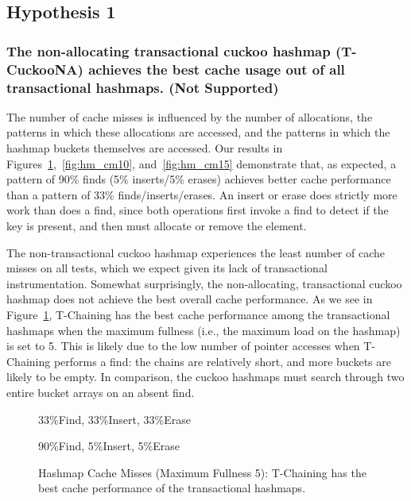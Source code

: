 \subsection{Hypothesis 1}
\subsubsection{The non-allocating transactional cuckoo hashmap (T-CuckooNA) achieves the best cache usage out of all transactional hashmaps. (Not Supported)}
\label{section:hmcm}

The number of cache misses is influenced by the number of allocations, the patterns in which these allocations are accessed, and the patterns in which the hashmap buckets themselves are accessed. Our results in Figures~\ref{fig:hm_cm5},~\ref{fig:hm_cm10}, and~\ref{fig:hm_cm15} demonstrate that, as expected, a pattern of 90\% finds (5\% inserts/5\% erases) achieves better cache performance than a pattern of 33\% finds/inserts/erases. An insert or erase does strictly more work than does a find, since both operations first invoke a find to detect if the key is present, and then must allocate or remove the element.

The non-transactional cuckoo hashmap experiences the least number of cache misses on all tests, which we expect given its lack of transactional instrumentation. Somewhat surprisingly, the non-allocating, transactional cuckoo hashmap does not achieve the best overall cache performance. 
As we see in Figure~\ref{fig:hm_cm5}, T-Chaining has the best cache performance among the transactional hashmaps when the maximum fullness (i.e., the maximum load on the hashmap) is set to 5. This is likely due to the low number of pointer accesses when T-Chaining performs a find: the chains are relatively short, and more buckets are likely to be empty.
In comparison, the cuckoo hashmaps must search through two entire bucket arrays on an absent find. 

    \begin{figure}[ht!]
    \centering
        \begin{minipage}{0.75\textwidth}
        \centering
            \caption*{33\%Find, 33\%Insert, 33\%Erase}
            \vspace{12pt}
        \end{minipage}
        \begin{minipage}{0.75\textwidth}
            \centering
            \caption*{90\%Find, 5\%Insert, 5\%Erase}
        \end{minipage}
        \caption[Hashmap Cache Misses (Maximum Fullness 5)]{Hashmap Cache Misses (Maximum Fullness 5): T-Chaining has the best cache performance of the transactional hashmaps.}
		\label{fig:hm_cm5}
    \end{figure}


